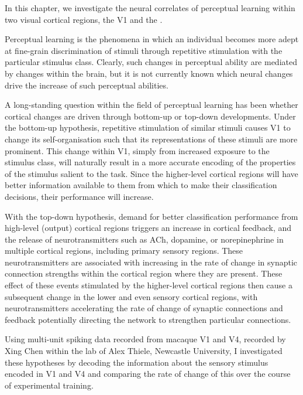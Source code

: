 In this chapter, we investigate the neural correlates of perceptual learning within two visual cortical regions, the \acf{V1} and the .

Perceptual learning is the phenomena in which an individual becomes more adept at fine-grain discrimination of stimuli through repetitive stimulation with the particular stimulus class.
Clearly, such changes in perceptual ability are mediated by changes within the brain, but it is not currently known which neural changes drive the increase of such perceptual abilities.

A long-standing question within the field of perceptual learning has been whether cortical changes are driven through bottom-up or top-down developments.
Under the bottom-up hypothesis, repetitive stimulation of similar stimuli causes \ac{V1} to change its self-organisation such that its representations of these stimuli are more prominent.
This change within \ac{V1}, simply from increased exposure to the stimulus class, will naturally result in a more accurate encoding of the properties of the stimulus salient to the task.
Since the higher-level cortical regions will have better information available to them from which to make their classification decisions, their performance will increase.

With the top-down hypothesis, demand for better classification performance from high-level (output) cortical regions triggers an increase in cortical feedback, and the release of neurotransmitters such as \ac{ACh}, dopamine, or norepinephrine in multiple cortical regions, including primary sensory regions.
These neurotransmitters are associated with increasing in the rate of change in synaptic connection strengths within the cortical region where they are present.
These effect of these events stimulated by the higher-level cortical regions then cause a subsequent change in the lower and even sensory cortical regions, with neurotransmitters accelerating the rate of change of synaptic connections and feedback potentially directing the network to strengthen particular connections.

Using multi-unit spiking data recorded from macaque \ac{V1} and \ac{V4}, recorded by Xing Chen within the lab of Alex Thiele, Newcastle University, I investigated these hypotheses by decoding the information about the sensory stimulus encoded in \ac{V1} and \ac{V4} and comparing the rate of change of this over the course of experimental training.
